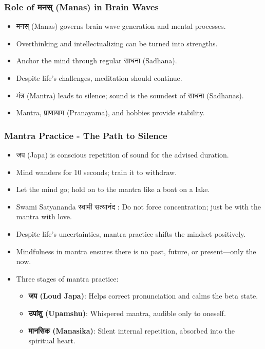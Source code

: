 \begin{frame}[fragile]\frametitle{Role of मनस् (Manas) in Brain Waves}
      \begin{itemize}
          \item मनस् (Manas) governs brain wave generation and mental processes.
          \item Overthinking and intellectualizing can be turned into strengths.
          \item Anchor the mind through regular साधना (Sadhana).
          \item Despite life’s challenges, meditation should continue.
          \item मंत्र (Mantra) leads to silence; sound is the soundest of साधना (Sadhanas).
          \item Mantra, प्राणायाम (Pranayama), and hobbies provide stability.
      \end{itemize}
\end{frame}

\begin{frame}[fragile]\frametitle{Mantra Practice - The Path to Silence}
      \begin{itemize}
          \item जप (Japa) is conscious repetition of sound for the advised duration.
          \item Mind wanders for 10 seconds; train it to withdraw.
          \item Let the mind go; hold on to the mantra like a boat on a lake.
          \item Swami Satyananda स्वामी सत्यानंद : Do not force concentration; just be with the mantra with love.
          \item Despite life’s uncertainties, mantra practice shifts the mindset positively.
          \item Mindfulness in mantra ensures there is no past, future, or present—only the now.
          \item Three stages of mantra practice:
            \begin{itemize}
                \item \textbf{ जप (Loud Japa)}: Helps correct pronunciation and calms the beta state.
                \item \textbf{उपांशु (Upamshu)}: Whispered mantra, audible only to oneself.
                \item \textbf{मानसिक (Manasika)}: Silent internal repetition, absorbed into the spiritual heart.
            \end{itemize}
      \end{itemize}
\end{frame}
